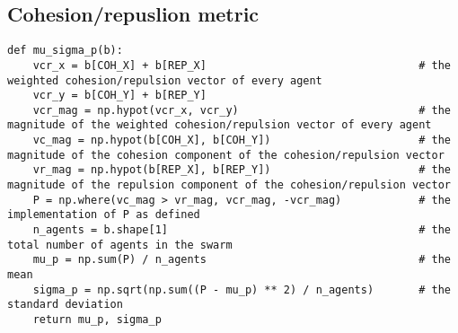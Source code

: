 \documentclass{article}
\begin{document}
\subsection{Cohesion/repuslion metric}
\begin{verbatim}
def mu_sigma_p(b):
    vcr_x = b[COH_X] + b[REP_X]                                 # the weighted cohesion/repulsion vector of every agent
    vcr_y = b[COH_Y] + b[REP_Y]
    vcr_mag = np.hypot(vcr_x, vcr_y)                            # the magnitude of the weighted cohesion/repulsion vector of every agent
    vc_mag = np.hypot(b[COH_X], b[COH_Y])                       # the magnitude of the cohesion component of the cohesion/repulsion vector
    vr_mag = np.hypot(b[REP_X], b[REP_Y])                       # the magnitude of the repulsion component of the cohesion/repulsion vector
    P = np.where(vc_mag > vr_mag, vcr_mag, -vcr_mag)            # the implementation of P as defined
    n_agents = b.shape[1]                                       # the total number of agents in the swarm
    mu_p = np.sum(P) / n_agents                                 # the mean
    sigma_p = np.sqrt(np.sum((P - mu_p) ** 2) / n_agents)       # the standard deviation
    return mu_p, sigma_p
\end{verbatim}
\end{document}
